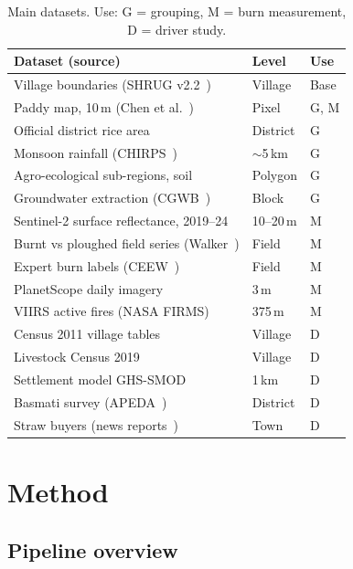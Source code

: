 \documentclass[sigconf,nonacm]{acmart}
\begin{document}
\begin{table}[t]
\caption{Main datasets. Use: G = grouping, M = burn measurement, D = driver study.}
\label{tab:data}
\small
\begin{tabularx}{\columnwidth}{@{}>{\raggedright\arraybackslash}X l l@{}}
\toprule
Dataset (source) & Level & Use \\
\midrule
Village boundaries (SHRUG v2.2~\cite{asher2021shrug}) & Village & Base \\
Paddy map, 10\,m (Chen et al.~\cite{chen2024rice}) & Pixel & G, M \\
Official district rice area~\cite{punjab2022abstract} & District & G \\
Monsoon rainfall (CHIRPS~\cite{funk2015chirps}) & $\sim$5\,km & G \\
Agro-ecological sub-regions, soil~\cite{nbsslup2018} & Polygon & G \\
Groundwater extraction (CGWB~\cite{cgwb2022punjab}) & Block & G \\
Sentinel-2 surface reflectance, 2019--24 & 10--20\,m & M \\
Burnt vs ploughed field series (Walker~\cite{walker2024data}) & Field & M \\
Expert burn labels (CEEW~\cite{ceew2026patterns}) & Field & M \\
PlanetScope daily imagery~\cite{planet2026} & 3\,m & M \\
VIIRS active fires (NASA FIRMS) & 375\,m & M \\
Census 2011 village tables~\cite{census2011pca} & Village & D \\
Livestock Census 2019~\cite{livestock2019} & Village & D \\
Settlement model GHS-SMOD~\cite{schiavina2023smod} & 1\,km & D \\
Basmati survey (APEDA~\cite{apeda2025basmati}) & District & D \\
Straw buyers (news reports~\cite{ht2017biomass,mongabay2021straw,bioenergy2026cbg}) & Town & D \\
\bottomrule
\end{tabularx}
\end{table}

\section{Method}
\label{sec:method}

\subsection{Pipeline overview}
\end{document}
